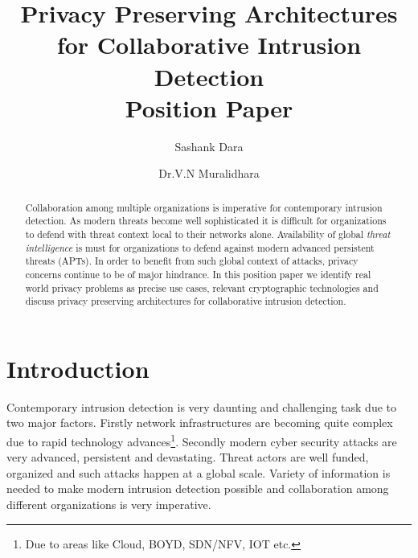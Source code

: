 \documentclass[runningheads,a4paper]{llncs}
\begin{document}
\title{Privacy Preserving Architectures for Collaborative Intrusion Detection \\ {\small Position Paper} }

\author{Sashank Dara \and Dr.V.N Muralidhara}


\begin{comment} \author{
\authorblockN{Sashank Dara}
\authorblockA{Cisco Systems Inc\\
IIIT-Bangalore \\
Bangalore, 560037, India\\
sadara@cisco.com}  \and
\authorblockN{Dr.V.N Muralidhara}
\authorblockA{IIIT-Bangalore\\
Bangalore, 560100, India\\
murali@iiitb.ac.in}
}
\end{comment}
\maketitle

\begin{abstract}
Collaboration among multiple organizations is imperative for contemporary intrusion detection. As modern threats become well sophisticated it is difficult for organizations to defend with threat context local to their networks alone. Availability of global \emph{threat intelligence} is must for organizations to defend against modern advanced persistent threats (APTs). In order to benefit from such global context of attacks, privacy concerns continue to be of major hindrance. In this position paper we identify real world privacy problems as precise use cases, relevant cryptographic technologies and discuss privacy preserving architectures for collaborative intrusion detection.

\end{abstract}

\section{Introduction}
Contemporary intrusion detection is very daunting and challenging task due to two major factors. Firstly  network infrastructures are becoming quite complex due to rapid technology advances\footnote{ Due to areas like Cloud, BOYD, SDN/NFV, IOT etc.}. Secondly modern cyber security attacks are very advanced, persistent and devastating. Threat actors are well funded, organized and such attacks happen at a global scale. Variety of information is needed to make modern intrusion detection possible and collaboration among different organizations is very imperative. 
\end{document}
